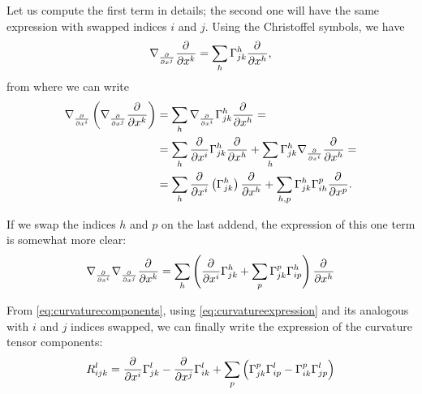 Let us compute the first term in details; the second one will have the same expression with swapped indices $i$ and $j$. Using the Christoffel symbols, we have
\[
	\nabla_{\frac{\partial^{} }{\partial x^j}} \frac{\partial^{} }{\partial x^k} = \sum_h \Gamma^h_{jk} \frac{\partial^{} }{\partial x^h},
\]
from where we can write
\begin{align*}
	\nabla_{\frac{\partial^{} }{\partial x^i}} \left( \nabla_{\frac{\partial^{} }{\partial x^j}} \frac{\partial^{} }{\partial x^k} \right) &= \sum_h \nabla_{\frac{\partial^{} }{\partial x^i}} \Gamma^h_{jk} \frac{\partial^{} }{\partial x^h} = \\
	&= \sum_h \frac{\partial^{} }{\partial x^i} \Gamma^h_{jk} \frac{\partial^{} }{\partial x^h} + \sum_h \Gamma^h_{jk} \nabla_{\frac{\partial^{} }{\partial x^i}} \frac{\partial^{} }{\partial x^h} =\\
	&= \sum_h \frac{\partial^{} }{\partial x^i} \left( \Gamma^h_{jk} \right) \frac{\partial^{} }{\partial x^h} + \sum_{h,p} \Gamma^h_{jk} \Gamma^p_{ih} \frac{\partial^{} }{\partial x^p}.
\end{align*}

If we swap the indices $h$ and $p$ on the last addend, the expression of this one term is somewhat more clear:
\begin{equation}
	\label{eq:curvatureexpression}
	\nabla_{\frac{\partial^{} }{\partial x^i}}\nabla_{\frac{\partial^{} }{\partial x^j}} \frac{\partial^{} }{\partial x^k} = \sum_h\left( \frac{\partial^{} }{\partial x^i} \Gamma^h_{jk} + \sum_p \Gamma^p_{jk} \Gamma^h_{ip} \right) \frac{\partial^{} }{\partial x^h}
\end{equation}

From \autoref{eq:curvaturecomponents}, using \autoref{eq:curvatureexpression} and its analogous with $i$ and $j$ indices swapped, we can finally write the expression of the curvature tensor components:
\[
	R^l_{ijk} = \frac{\partial^{} }{\partial x^i} \Gamma^l_{jk} - \frac{\partial^{} }{\partial x^j} \Gamma^l_{ik} + \sum_p \left( \Gamma^p_{jk} \Gamma^l_{ip} - \Gamma^p_{ik} \Gamma^l_{jp} \right)
\]